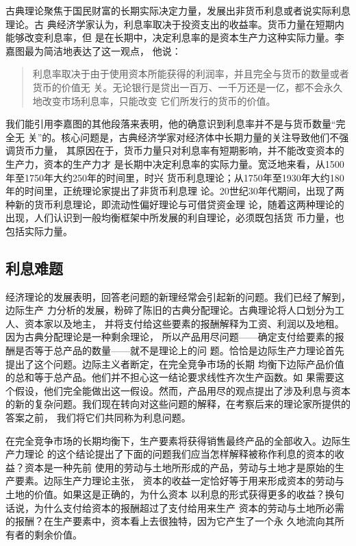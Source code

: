古典理论聚焦于国民财富的长期实际决定力量，发展出非货币利息或者说实际利息理论。古
典经济学家认为，利息率取决于投资支出的收益率。货币力量在短期内能够改变利息率，但
是在长期中，决定利息率的是资本生产力这种实际力量。李嘉图最为简洁地表达了这一观点，
他说：
\begin{quotation}
  利息率取决于由于使用资本所能获得的利润率，并且完全与货币的数量或者货币的价值无
  关。无论银行是贷出一百万、一千万还是一亿，都不会永久地改变市场利息率，只能改变
  它们所发行的货币的价值。
\end{quotation}

我们能引用李嘉图的其他段落来表明，他的确意识到利息率并不是与货币数量“完全无
关”的。核心问题是，古典经济学家对经济体中长期力量的关注导致他们不强调货币力量，
其原因在于，货币力量只对利息率有短期影响，并不能改变资本的生产力，资本的生产力才
是长期中决定利息率的实际力量。宽泛地来看，从1500年至1750年大约250年的时间里，时兴
货币利息理论；从1750年至1930年大约180年的时间里，正统理论家提出了非货币利息理
论。20世纪30年代期间，出现了两种新的货币利息理论，即流动性偏好理论与可借贷资金理
论，随着这两种理论的出现，人们认识到一般均衡框架中所发展的利自理论，必须既包括货
币力量，也包括实际力量。

\subsection{利息难题}

经济理论的发展表明，回答老问题的新理经常会引起新的问题。我们已经了解到，边际生产
力分析的发展，粉碎了陈旧的古典分配理论。古典理论将人口划分为工人、资本家以及地主，
并将支付给这些要素的报酬解释为工资、利润以及地租。因为古典分配理论是一种剩余理论，
所以产品用尽问题——确定支付给要素的报酬是否等于总产品的数量——就不是理论上的问
题。恰恰是边际生产力理论首先提出了这个问题。边际主义者断定，在完全竞争市场的长期
均衡下边际产品价值的总和等于总产品。他们并不担心这一结论要求线性齐次生产函数。如
果需要这个假设，他们完全能做出这一假设。然而，产品用尽的观点提出了涉及利息与资本
的新的复杂问题。我们现在转向对这些问题的解释，在考察后来的理论家所提供的答案之前，
我们将它们共同称为利息问题。

在完全竞争市场的长期均衡下，生产要素将获得销售最终产品的全部收入。边际生产力理论
的这个结论提出了下面的问题我们应当怎样解释被称作利息的资本的收益？资本是一种先前
使用的劳动与土地所形成的产品，劳动与土地才是原始的生产要素。边际生产力理论主张，
资本的收益一定恰好等于用来形成资本的劳动与土地的价值。如果这是正确的，为什么资本
以利息的形式获得更多的收益？换句话说，为什么支付给资本的报酬超过了支付给用来生产
资本的劳动与土地所必需的报酬？在生产要素中，资本看上去很独特，因为它产生了一个永
久地流向其所有者的剩余价值。


